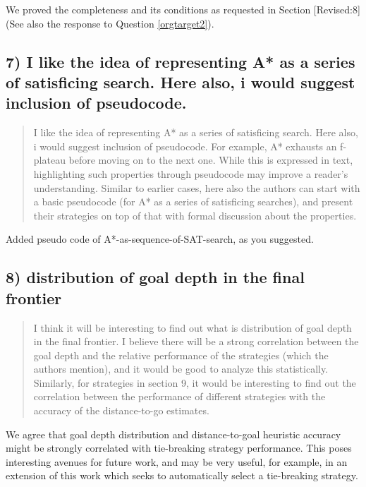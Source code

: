 \documentclass{article}
\begin{document}
We proved the completeness and its conditions as requested in Section [Revised:8] (See also the response to Question \ref{orgtarget2}).

\subsection{7) I like the idea of representing A* as a series of satisficing search. Here also, i would suggest inclusion of pseudocode.}
\label{sec:orgheadline21}

\begin{quote}
 I like the idea of representing A* as a series of satisficing
search. Here also, i would suggest inclusion of pseudocode. For
example, A* exhausts an f-plateau before moving on to the next one.
While this is expressed in text, highlighting such properties through
pseudocode may improve a reader's understanding. Similar to earlier
cases, here also the authors can start with a basic pseudocode (for A*
as a series of satisficing searches), and present their strategies on
top of that with formal discussion about the properties.
\end{quote}

Added pseudo code of A*-as-sequence-of-SAT-search, as you suggested.

\subsection{8) distribution of goal depth in the final frontier}
\label{sec:orgheadline22}

\begin{quote}
 I think it will be interesting to find out what is distribution of
goal depth in the final frontier. I believe there will be a strong
correlation between the goal depth and the relative performance of the
strategies (which the authors mention), and it would be good to
analyze this statistically. Similarly, for strategies in section 9, it
would be interesting to find out the correlation between the
performance of different strategies with the accuracy of the
distance-to-go estimates.
\end{quote}

We agree that goal depth distribution
and distance-to-goal heuristic accuracy might be strongly correlated with tie-breaking strategy performance.
This poses interesting avenues for future work, 
and may be very useful, for example, in an extension of this work which 
seeks to automatically select a tie-breaking strategy.  
\end{document}
